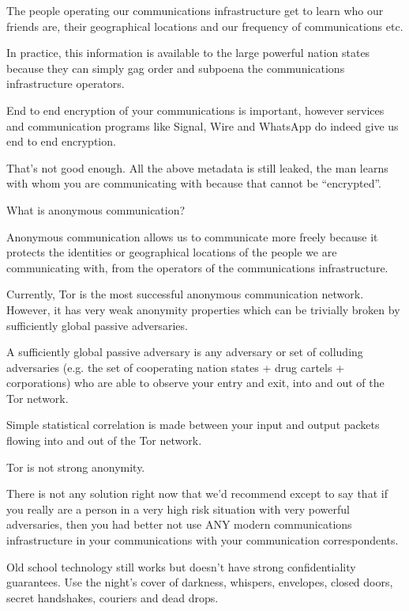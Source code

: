 \documentclass[statementpaper,oneside,article,14pt]{memoir}
\begin{document}
\newpage

The people operating our communications infrastructure
get to learn who our friends are, their geographical locations and
our frequency of communications etc.

In practice, this information is available to the large powerful
nation states because they can simply gag order and subpoena the
communications infrastructure operators.

End to end encryption of your communications is important, however
services and communication programs like Signal, Wire and WhatsApp do
indeed give us end to end encryption.

That's not good enough. All the above metadata is still leaked, the man learns
with whom you are communicating with because that cannot be ``encrypted''.

\newpage

What is anonymous communication?

Anonymous communication allows us to communicate more freely because
it protects the identities or geographical locations of the people we
are communicating with, from the operators of the communications
infrastructure.

Currently, Tor is the most successful anonymous communication network.
However, it has very weak anonymity properties which can be trivially
broken by sufficiently global passive adversaries.

A sufficiently global passive adversary is any adversary or set of colluding
adversaries (e.g. the set of cooperating nation states + drug cartels + corporations)
who are able to observe your entry and exit, into and out of the Tor network.

Simple statistical correlation is made between your input and output packets flowing
into and out of the Tor network.

Tor is not strong anonymity.

\newpage

There is not any solution right now that we'd recommend except to say
that if you really are a person in a very high risk situation with
very powerful adversaries, then you had better not use ANY modern
communications infrastructure in your communications with your
communication correspondents.

Old school technology still works but doesn't have strong
confidentiality guarantees. Use the night's cover of darkness,
whispers, envelopes, closed doors, secret handshakes,
couriers and dead drops.
\end{document}
